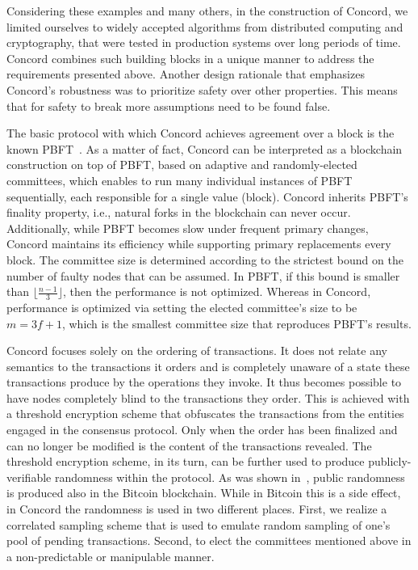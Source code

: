 Considering these examples and many others, in the construction of Concord, we limited ourselves to widely accepted algorithms from distributed computing and cryptography, that were tested in production systems over long periods of time. Concord combines such building blocks in a unique manner to address the requirements presented above. Another design rationale that emphasizes Concord's robustness was to prioritize safety over other properties. This means that for safety to break more assumptions need to be found false.

The basic protocol with which Concord achieves agreement over a block is the known PBFT~\cite{PBFT}. As a matter of fact, Concord can be interpreted as a blockchain construction on top of PBFT, based on adaptive and randomly-elected committees, which enables to run many individual instances of PBFT sequentially, each responsible for a single value (block). Concord inherits PBFT's finality property, i.e., natural forks in the blockchain can never occur. Additionally, while PBFT becomes slow under frequent primary changes, Concord maintains its efficiency while supporting primary replacements every block. The committee size is determined according to the strictest bound on the number of faulty nodes that can be assumed. In PBFT, if this bound is smaller than $\lfloor \frac{n-1}{3} \rfloor$, then the performance is not optimized. Whereas in Concord, performance is optimized via setting the elected committee's size to be $m=3f+1$, which is the smallest committee size that reproduces PBFT's results.

Concord focuses solely on the ordering of transactions. It does not relate any semantics to the transactions it orders and is completely unaware of a state these transactions produce by the operations they invoke. It thus becomes possible to have nodes completely blind to the transactions they order. This is achieved with a threshold encryption scheme that obfuscates the transactions from the entities engaged in the consensus protocol. Only when the order has been finalized and can no longer be modified is the content of the transactions revealed. The threshold encryption scheme, in its turn, can be further used to produce publicly-verifiable randomness within the protocol. As was shown in~\cite{BticoinPublicRandomSource}, public randomness is produced also in the Bitcoin blockchain. While in Bitcoin this is a side effect, in Concord the randomness is used in two different places. First, we realize a correlated sampling scheme that is used to emulate random sampling of one's pool of pending transactions. Second, to elect the committees mentioned above in a non-predictable or manipulable manner.

